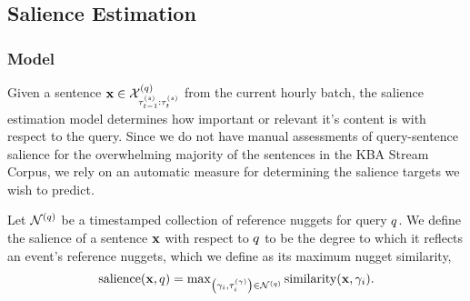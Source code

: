\subsection{Salience Estimation}
\label{sec:salpred}

\subsubsection{Model}

Given a sentence $\mathbf{x} \in
\mathcal{X}^{(q)}_{\tau^{(s)}_{t-1}:\tau^{(s)}_{t} }$ from the current
hourly batch, the salience estimation model determines how important or
relevant it's content is with respect to the query. Since we do not have
manual assessments of query-sentence salience for the overwhelming majority of
the sentences in the KBA Stream Corpus, we rely on an automatic measure for
determining the salience targets we wish to predict.

Let $\mathcal{N}^{(q)}$ be a timestamped collection of reference nuggets
for query $q$. We define the salience of a sentence $\mathbf{x}$ with
respect to $q$ to be the degree to which it reflects an event's reference
nuggets, which we define as its maximum nugget similarity,
\begin{align}
\operatorname{salience}(\mathbf{x}, q) = \operatorname{max}_{\left(\gamma_i, \tau^{(\gamma)}_i\right) \in \mathcal{N}^{(q)}} 
\operatorname{similarity}(\mathbf{x}, \gamma_i). \label{eq:salience}
\end{align}

